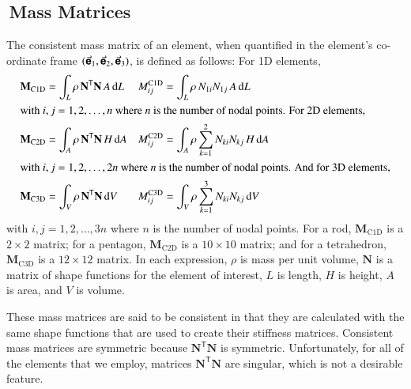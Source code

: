 \subsection{$\,$Mass Matrices}

The consistent mass matrix of an element, \cite{Archer65} when quantified in the element's co-ordinate frame $( \vec{\boldsymbol{\mathsf{e}}}_1 , \vec{\boldsymbol{\mathsf{e}}}_2 , \vec{\boldsymbol{\mathsf{e}}}_3 )$, is defined as follows:  For 1D elements,
\begin{subequations}
    \label{consistentMassMatrix}
    \begin{align}
    \mathbf{M}_{\mathrm{C1D}} & = \int_{L} \rho \, \mathbf{N}^{\mathsf{T}} \mathbf{N} \,
    A \, \mathrm{d} L & M^{\mathrm{C1D}}_{ij} & = 
    \int_L \rho \, N_{1i} N_{1j} \, A \, \mathrm{d} L
    \label{consistentMassMatrix1D} \\
    \intertext{with $i,j = 1, 2, \ldots , n$ where $n$ is the number of nodal points. For 2D elements,}
    \mathbf{M}_{\mathrm{C2D}} & = \int_{A} \rho \, \mathbf{N}^{\mathsf{T}} \mathbf{N} \,
    H \, \mathrm{d} A & M^{\mathrm{C2D}}_{ij} & =
    \int_A \rho \sum_{k=1}^2 N_{ki} N_{kj} \, H \, \mathrm{d} A
    \label{consistentMassMatrix2D} \\
    \intertext{with $i,j = 1 , 2, \ldots , 2n$ where $n$ is the number of nodal points.  And for 3D elements,}
    \mathbf{M}_{\mathrm{C3D}} & = \int_{V} \rho \, \mathbf{N}^{\mathsf{T}} \mathbf{N} \,
    \mathrm{d} V & M^{\mathrm{C3D}}_{ij} & = 
    \int_V \rho \sum_{k=1}^3 N_{ki} N_{kj} \, \mathrm{d} V
    \label{consistentMassMatrix3D}
    \end{align}
\end{subequations}
with $i, j = 1, 2, \ldots , 3n$ where $n$ is the number of nodal points.  For a rod, $\mathbf{M}_{\mathrm{C1D}}$ is a $2 \! \times \! 2$ matrix; for a pentagon, $\mathbf{M}_{\mathrm{C2D}}$ is a $10 \! \times \! 10$ matrix; and for a tetrahedron, $\mathbf{M}_{\mathrm{C3D}}$ is a $12 \! \times \! 12$ matrix.  In each expression, $\rho$ is mass per unit volume, $\mathbf{N}$ is a matrix of shape functions for the element of interest, $L$ is length, $H$ is height, $A$ is area, and $V$ is volume.  

These mass matrices are said to be consistent in that they are calculated with the same shape functions that are used to create their stiffness matrices.  Consistent mass matrices are symmetric because $\mathbf{N}^{\mathsf{T}} \mathbf{N}$ is symmetric.  Unfortunately, for all of the elements that we employ, matrices $\mathbf{N}^{\mathsf{T}} \mathbf{N}$ are singular, which is not a desirable feature.

